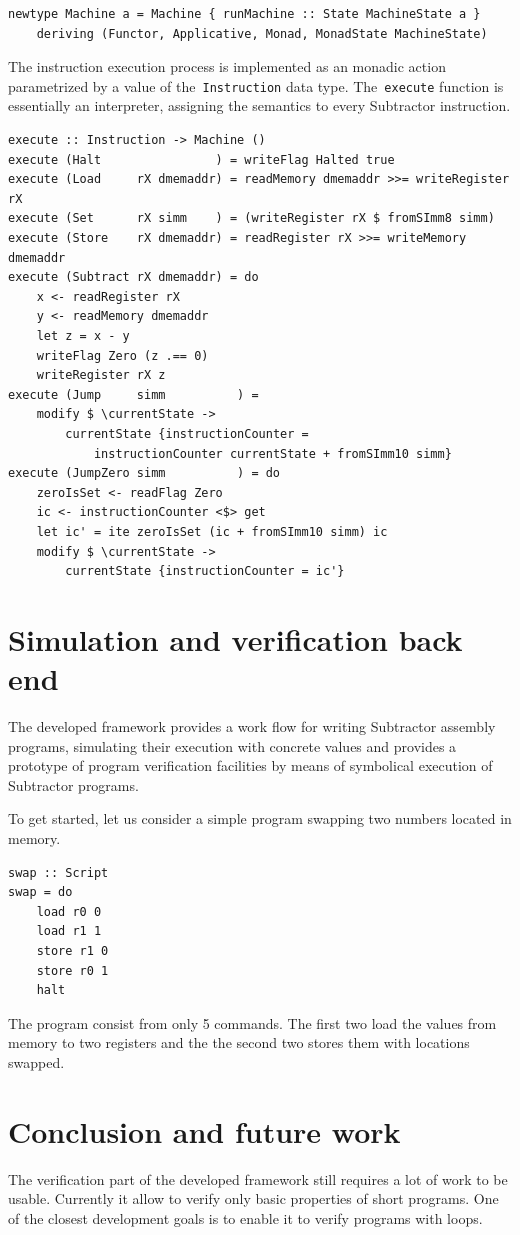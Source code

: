 \begin{verbatim}
newtype Machine a = Machine { runMachine :: State MachineState a }
    deriving (Functor, Applicative, Monad, MonadState MachineState)
\end{verbatim}

The instruction execution process is implemented as an monadic action parametrized by a value of the~\texttt{Instruction} data type. The~\texttt{execute} function is essentially an interpreter, assigning the semantics to every Subtractor instruction.

\begin{verbatim}
execute :: Instruction -> Machine ()
execute (Halt                ) = writeFlag Halted true
execute (Load     rX dmemaddr) = readMemory dmemaddr >>= writeRegister rX
execute (Set      rX simm    ) = (writeRegister rX $ fromSImm8 simm)
execute (Store    rX dmemaddr) = readRegister rX >>= writeMemory dmemaddr
execute (Subtract rX dmemaddr) = do
    x <- readRegister rX
    y <- readMemory dmemaddr
    let z = x - y
    writeFlag Zero (z .== 0)
    writeRegister rX z
execute (Jump     simm          ) =
    modify $ \currentState ->
        currentState {instructionCounter =
            instructionCounter currentState + fromSImm10 simm}
execute (JumpZero simm          ) = do
    zeroIsSet <- readFlag Zero
    ic <- instructionCounter <$> get
    let ic' = ite zeroIsSet (ic + fromSImm10 simm) ic
    modify $ \currentState ->
        currentState {instructionCounter = ic'}
\end{verbatim}

\section{Simulation and verification back end}

The developed framework provides a work flow for writing Subtractor assembly programs, simulating their execution with concrete values and provides a prototype of program verification facilities by means of symbolical execution of Subtractor programs.

To get started, let us consider a simple program swapping two numbers located in memory.

\begin{verbatim}
swap :: Script
swap = do
    load r0 0
    load r1 1
    store r1 0
    store r0 1
    halt
\end{verbatim}

The program consist from only 5 commands. The first two load the values from memory to two registers and the the second two stores them with locations swapped.

\section{Conclusion and future work}

The verification part of the developed framework still requires a lot of work to be usable. Currently it allow to verify only basic properties of short programs. One of the closest development goals is to enable it to verify programs with loops.


